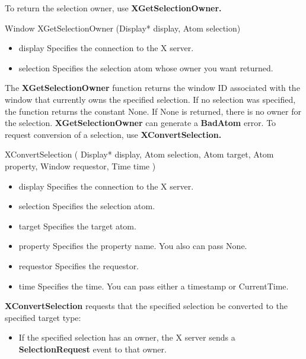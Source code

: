 \documentclass{report}
\begin{document}
\begin{itemize}
        \bigbreak \noindent 
        To return the selection owner, use \textbf{XGetSelectionOwner.}
        \bigbreak \noindent 
        \begin{cppcode}
            Window XGetSelectionOwner (Display* display, Atom selection)
        \end{cppcode}
        \bigbreak \noindent
        \begin{itemize}
            \item display Specifies the connection to the X server.
            \item selection Specifies the selection atom whose owner you want returned.
        \end{itemize}
        The \textbf{XGetSelectionOwner} function returns the window ID associated with the window that currently owns the specified selection. If no selection was specified, the function returns the constant None. If None is returned, there is no owner for the selection.
        \bigbreak \noindent 
        \textbf{XGetSelectionOwner} can generate a \textbf{BadAtom} error.
        \bigbreak \noindent 
        To request conversion of a selection, use \textbf{XConvertSelection.}
        \bigbreak \noindent 
        \begin{cppcode}
            XConvertSelection (
                Display* display,
                Atom selection,
                Atom target,
                Atom property,
                Window requestor,
                Time time
            )
        \end{cppcode}
        \bigbreak \noindent
        \begin{itemize}
            \item display Specifies the connection to the X server.
            \item selection Specifies the selection atom.
            \item target Specifies the target atom.
            \item property Specifies the property name. You also can pass None.
            \item requestor Specifies the requestor.
            \item time Specifies the time. You can pass either a timestamp or CurrentTime.
        \end{itemize}
        \textbf{XConvertSelection} requests that the specified selection be converted to the specified target type:
        \begin{itemize}
            \item If the specified selection has an owner, the X server sends a \textbf{SelectionRequest} event to that owner.

\end{itemize}
\end{itemize}
\end{document}
